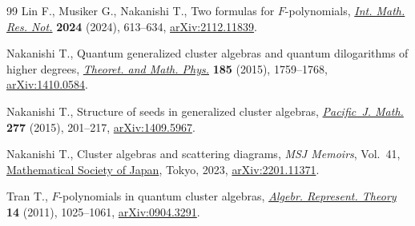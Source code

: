 \documentclass[10pt,a4paper]{amsart}
\providecommand{\LastPageEnding}{}
\numberwithin{equation}{section}
\begin{document}
\begin{thebibliography}{99}
Lin F., Musiker G., Nakanishi T., Two formulas for {$F$}-polynomials,
   \href{https://doi.org/10.1093/imrn/rnad074}{\textit{Int. Math. Res. Not.}} \textbf{2024} (2024), 613--634,
  \href{https://arxiv.org/abs/2112.11839}{arXiv:2112.11839}.

Nakanishi T., Quantum generalized cluster algebras and quantum dilogarithms of
  higher degrees, \href{https://doi.org/10.1007/s11232-015-0377-9}{\textit{Theoret. and Math. Phys.}} \textbf{185} (2015),
  1759--1768, \href{https://arxiv.org/abs/1410.0584}{arXiv:1410.0584}.

Nakanishi T., Structure of seeds in generalized cluster algebras,
  \href{https://doi.org/10.2140/pjm.2015.277.201}{\textit{Pacific~J. Math.}} \textbf{277} (2015), 201--217, \href{https://arxiv.org/abs/1409.5967}{arXiv:1409.5967}.

Nakanishi T., Cluster algebras and scattering diagrams, \textit{MSJ Memoirs}, Vol.~41, \href{https://doi.org/10.1142/e073}{Mathematical Society of Japan}, Tokyo, 2023, \href{https://arxiv.org/abs/2201.11371}{arXiv:2201.11371}.

Tran T., {$F$}-polynomials in quantum cluster algebras,  \href{https://doi.org/10.1007/s10468-010-9226-6}{\textit{Algebr.
  Represent. Theory}} \textbf{14} (2011), 1025--1061, \href{https://arxiv.org/abs/0904.3291}{arXiv:0904.3291}.

\end{thebibliography}\LastPageEnding
\end{document}
